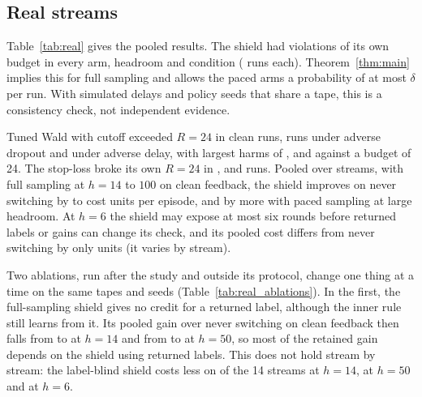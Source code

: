 \documentclass[10pt]{article}
\theoremstyle{plain}
\theoremstyle{definition}
\begin{document}
\subsection{Real streams}
Table~\ref{tab:real} gives the pooled results. The shield had \RealShieldViolClean{} violations of its own budget in every arm, headroom and condition (\RealRunsPerArm{} runs each). Theorem~\ref{thm:main} implies this for full sampling and allows the paced arms a probability of at most $\delta$ per run. With simulated delays and policy seeds that share a tape, this is a consistency check, not independent evidence.
\begin{table}[!htbp]
\caption{Real streams, pooled over 14 streams (equal weight), \RealRunsPerArm{} runs per arm and condition. $J$ is mean cost per episode, ``vs never'' the difference in $J$, ``viol.'' the number of runs above the budget: $R=24$ for the comparators, the arm's own $R$ ($24$, $60$ or $110$) for the shield and stop-loss.}\label{tab:real}
\centering\scriptsize
\resizebox{\linewidth}{!}{}
\end{table}
Tuned Wald with cutoff exceeded $R=24$ in \RealWaldExceedClean{} clean runs, \RealWaldExceedDropout{} runs under adverse dropout and \RealWaldExceedDelay{} under adverse delay, with largest harms of \RealWaldMaxClean, \RealWaldMaxDropout{} and \RealWaldMaxDelay{} against a budget of 24. The stop-loss broke its own $R=24$ in \RealStopExceedClean, \RealStopExceedDropout{} and \RealStopExceedDelay{} runs.
Pooled over streams, with full sampling at $h=14$ to $100$ on clean feedback, the shield improves on never switching by \RealPiVsNeverCleanHfourteen{} to \RealPiVsNeverCleanHhundred{} cost units per episode, and by more with paced sampling at large headroom. At $h=6$ the shield may expose at most six rounds before returned labels or gains can change its check, and its pooled cost differs from never switching by only \RealSixVsNever{} units (it varies by stream).

\begin{table}[!htbp]
\caption{Post hoc ablations on the 14 real streams: pooled gain over never switching, in cost units per episode (equal weight per stream; higher is better). ``Label-blind'' gives the shield no credit for returned labels.}\label{tab:real_ablations}
\centering\small

\end{table}

Two ablations, run after the study and outside its protocol, change one thing at a time on the same tapes and seeds (Table~\ref{tab:real_ablations}). In the first, the full-sampling shield gives no credit for a returned label, although the inner rule still learns from it. Its pooled gain over never switching on clean feedback then falls from \AblFullHFourteen{} to \AblBlindHFourteen{} at $h=14$ and from \AblFullHFifty{} to \AblBlindHFifty{} at $h=50$, so most of the retained gain depends on the shield using returned labels. This does not hold stream by stream: the label-blind shield costs less on \AblBlindBetterFourteen{} of the 14 streams at $h=14$, \AblBlindBetterFifty{} at $h=50$ and \AblBlindBetterSix{} at $h=6$.
\end{document}
